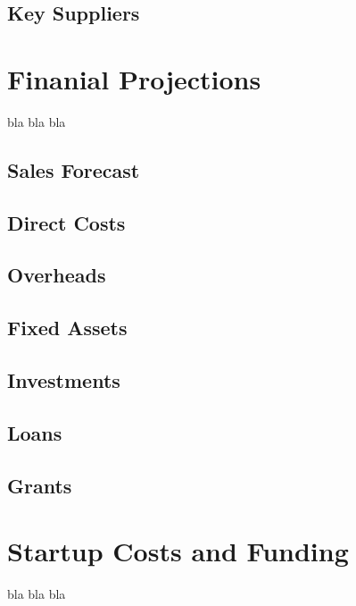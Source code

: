 \documentclass[letterpaper,10pt,openany,oneside,english]{sphinxmanual}
\begin{document}
\section{Key Suppliers}
\label{\detokenize{market-analysis:key-suppliers}}

\chapter{Finanial Projections}
\label{\detokenize{financial-projections:finanial-projections}}\label{\detokenize{financial-projections::doc}}
bla bla bla


\section{Sales Forecast}
\label{\detokenize{financial-projections:sales-forecast}}

\section{Direct Costs}
\label{\detokenize{financial-projections:direct-costs}}

\section{Overheads}
\label{\detokenize{financial-projections:overheads}}

\section{Fixed Assets}
\label{\detokenize{financial-projections:fixed-assets}}

\section{Investments}
\label{\detokenize{financial-projections:investments}}

\section{Loans}
\label{\detokenize{financial-projections:loans}}

\section{Grants}
\label{\detokenize{financial-projections:grants}}

\chapter{Startup Costs and Funding}
\label{\detokenize{startup-funding:startup-costs-and-funding}}\label{\detokenize{startup-funding::doc}}
bla bla bla
\end{document}
